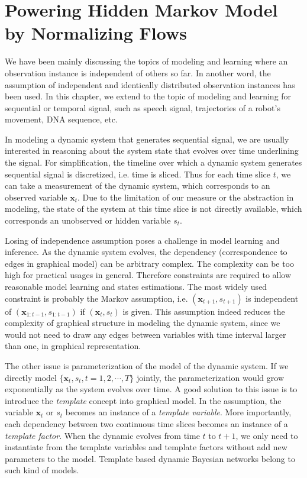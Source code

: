 \chapter{Powering Hidden Markov Model by Normalizing Flows}
We have been mainly discussing the topics of modeling and learning where an observation instance is independent of others so far. In another word, the assumption of independent and identically distributed observation instances has been used. In this chapter, we extend to the topic of modeling and learning for sequential or temporal signal, such as speech signal, trajectories of a robot's movement, DNA sequence, etc.

In modeling a dynamic system that generates sequential signal, we are usually interested in reasoning about the system state that evolves over time underlining the signal. For simplification, the timeline over which a dynamic system generates sequential signal is discretized, i.e. time is sliced. Thus for each time slice $t$, we can take a measurement of the dynamic system, which corresponds to an observed variable $\bm{x}_t$. Due to the limitation of our measure or the abstraction in modeling, the state of the system at this time slice is not directly available, which corresponds an unobserved or hidden variable $s_t$.

Losing of independence assumption poses a challenge in model learning and inference. As the dynamic system evolves, the dependency (correspondence to edges in graphical model) can be arbitrary complex. The complexity can be too high for practical usages in general. Therefore constraints are required to allow reasonable model learning and states estimations.
The most widely used constraint is probably the Markov assumption, i.e. $(\bm{x}_{t+1}, {s}_{t+1})$ is independent of $(\bm{x}_{1:t-1}, {s}_{1:t-1})$ if $(\bm{x}_{t}, {s}_{t})$ is given. This assumption indeed reduces the complexity of graphical structure in modeling the dynamic system, since we would not need to draw any edges between variables with time interval larger than one, in graphical representation.

The other issue is parameterization of the model of the dynamic system. If we directly model $\{\bm{x}_t, {s}_t, t=1, 2, \cdots, T\}$ jointly, the parameterization would grow exponentially as the system evolves over time. A good solution to this issue is to introduce the \textit{template} concept into graphical model. In the assumption, the variable $\bm{x}_t$ or $s_t$ becomes an instance of a \textit{template variable}. More importantly, each dependency between two continuous time slices becomes an instance of a \textit{template factor}. When the dynamic evolves from time $t$ to $t+1$, we only need to instantiate from the template variables and template factors without add new parameters to the model. Template based dynamic Bayesian networks belong to such kind of models.

